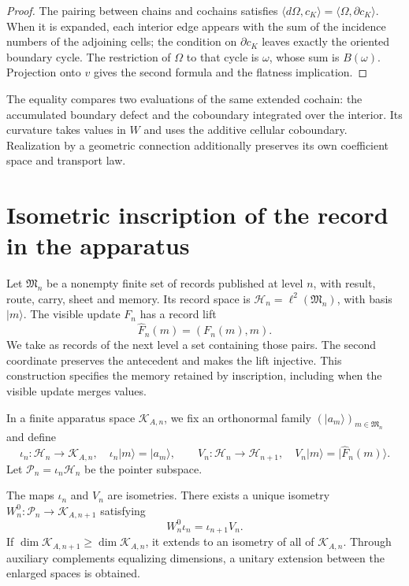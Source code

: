 \begin{proof}
The pairing between chains and cochains satisfies
\(\langle d\Omega,c_K\rangle=\langle\Omega,\partial c_K\rangle\).
When it is expanded, each interior edge appears with the sum of the incidence
numbers of the adjoining cells; the condition on
\(\partial c_K\) leaves exactly the oriented boundary cycle.
The restriction of \(\Omega\) to that cycle is \(\omega\), whose sum
is \(B(\omega)\). Projection onto \(v\) gives the second formula
and the flatness implication.
\end{proof}

The equality compares two evaluations of the same extended cochain:
the accumulated boundary defect and the coboundary integrated over the interior.
Its curvature takes values in \(W\) and uses the additive cellular coboundary.
Realization by a geometric connection additionally preserves
its own coefficient space and transport law.

\section{Isometric inscription of the record in the apparatus}
\label{x_reciprocidad:vii:sec:observador-aparato}

Let \(\mathfrak M_n\) be a nonempty finite set of records
published at level \(n\), with result, route, carry, sheet and memory.
Its record space is
\(\mathcal H_n=\ell^2(\mathfrak M_n)\), with basis \(|m\rangle\).
The visible update \(F_n\) has a record lift
\[
 \widehat F_n(m)=(F_n(m),m).
\]
We take as records of the next level a set containing those
pairs. The second coordinate preserves the antecedent and makes the lift
injective. This construction specifies the memory retained by
inscription, including when the visible update merges values.

In a finite apparatus space \(\mathcal K_{A,n}\), we fix an
orthonormal family \((|a_m\rangle)_{m\in\mathfrak M_n}\) and define
\[
 \iota_n:\mathcal H_n\longrightarrow\mathcal K_{A,n},
 \quad \iota_n|m\rangle=|a_m\rangle,
 \qquad
 V_n:\mathcal H_n\longrightarrow\mathcal H_{n+1},
 \quad V_n|m\rangle=|\widehat F_n(m)\rangle.
\]
Let \(\mathcal P_n=\iota_n\mathcal H_n\) be the pointer subspace.

\begin{theorem}
\label{x_reciprocidad:vii:thm:observador-entrelazador}
The maps \(\iota_n\) and \(V_n\) are isometries. There exists a unique
isometry \(W_n^0:\mathcal P_n\longrightarrow\mathcal K_{A,n+1}\)
satisfying
\begin{equation}
 W_n^0\iota_n=\iota_{n+1}V_n.
 \label{x_reciprocidad:vii:eq:observador-cuadrado}
\end{equation}
If \(\dim\mathcal K_{A,n+1}\geq\dim\mathcal K_{A,n}\),
it extends to an isometry of all of \(\mathcal K_{A,n}\).
Through auxiliary complements equalizing dimensions, a unitary
extension between the enlarged spaces is obtained.
\end{theorem}

